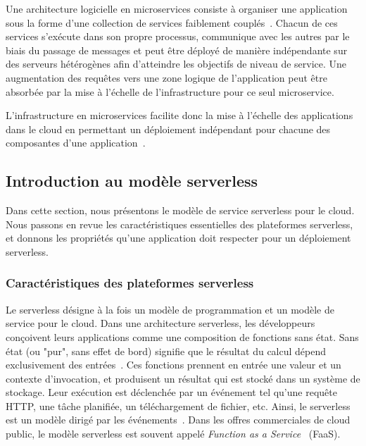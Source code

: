 Une architecture logicielle en microservices consiste à organiser une application sous la forme d'une collection de services faiblement couplés~\cite{12factor}. Chacun de ces services s'exécute dans son propre processus, communique avec les autres par le biais du passage de messages et peut être déployé de manière indépendante sur des serveurs hétérogènes afin d'atteindre les objectifs de niveau de service. Une augmentation des requêtes vers une zone logique de l'application peut être absorbée par la mise à l'échelle de l'infrastructure pour ce seul microservice.

L'infrastructure en microservices facilite donc la mise à l'échelle des applications dans le cloud en permettant un déploiement indépendant pour chacune des composantes d'une application~\cite{vaneykSPECRGReferenceArchitecture2019}.

\subsection{Introduction au modèle serverless}

Dans cette section, nous présentons le modèle de service serverless pour le cloud. Nous passons en revue les caractéristiques essentielles des plateformes serverless, et donnons les propriétés qu'une application doit respecter pour un déploiement serverless.

\subsubsection{Caractéristiques des plateformes serverless}


Le serverless désigne à la fois un modèle de programmation et un modèle de service pour le cloud. Dans une architecture serverless, les développeurs conçoivent leurs applications comme une composition de fonctions sans état. Sans état (ou "pur", sans effet de bord) signifie que le résultat du calcul dépend exclusivement des entrées~\cite{burckhardtNetheriteEfficientExecution}. Ces fonctions prennent en entrée une valeur et un contexte d'invocation, et produisent un résultat qui est stocké dans un système de stockage. Leur exécution est déclenchée par un événement tel qu'une requête HTTP, une tâche planifiée, un téléchargement de fichier, etc. Ainsi, le serverless est un modèle dirigé par les événements~\cite{SchleierSmith2021WhatSC}. Dans les offres commerciales de cloud public, le modèle serverless est souvent appelé \textit{Function as a Service}~\cite{hellersteinServerlessComputingOne2019} (\gls{FaaS}).

